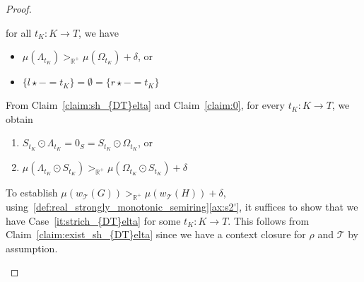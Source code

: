 \begin{proof}
\begin{enumerate}
            for all $t_K : K \to T$, we have  
                            \begin{itemize}                                
                                \item $\mu(\Lambda_{t_K}) >_{\mathbb{R}^+} \mu(\Omega_{t_K}) + \delta$,
                                 or
                                \item $\{l \star - = t_K\} = \emptyset = \{r \star - = t_K\}$
                            \end{itemize}
            From Claim~\ref{claim:sh_{DT}elta} and Claim~\ref{claim:0}, for every \( t_K: K \rightarrow T \), we obtain
            \begin{enumerate}[label=(\roman*)]
                \item $S_{t_K} \odot \Lambda_{t_K} = 0_S =  S_{t_K} \odot \Omega_{t_K}$, or
                \item  \label{it:strich_{DT}elta}  $\mu(\Lambda_{t_K} \odot S_{t_K}) >_{\mathbb{R}^+} \mu(\Omega_{t_K} \odot S_{t_K}) + \delta$
            \end{enumerate}
            To establish $ \mu(w_\mathcal{T}(G)) >_{\mathbb{R}^+} \mu(w_\mathcal{T}(H)) + \delta$, using~\autoref{def:real_strongly_monotonic_semiring}\eqref{ax:s2'}, 
            it suffices to show that we have Case~\ref{it:strich_{DT}elta} for some $t_K : K \to T$.
            This follows from Claim~\ref{claim:exist_sh_{DT}elta} since we have a context closure for $\rho$ and $\mathcal{T}$ by assumption.

\end{enumerate}
\end{proof}
